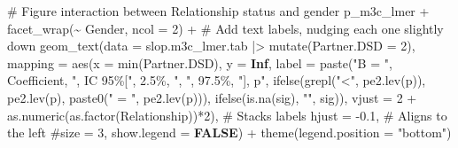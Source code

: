 \documentclass[
  bookmarksnumbered]{article}
\newenvironment{Shaded}{\begin{snugshade}}{\end{snugshade}}
\newcommand{\AttributeTok}[1]{\textcolor[rgb]{0.80,0.80,0.80}{#1}}
\newcommand{\CommentTok}[1]{\textcolor[rgb]{0.50,0.62,0.50}{#1}}
\newcommand{\ConstantTok}[1]{\textcolor[rgb]{0.86,0.64,0.64}{\textbf{#1}}}
\newcommand{\DecValTok}[1]{\textcolor[rgb]{0.86,0.86,0.80}{#1}}
\newcommand{\FloatTok}[1]{\textcolor[rgb]{0.75,0.75,0.82}{#1}}
\newcommand{\FunctionTok}[1]{\textcolor[rgb]{0.94,0.94,0.56}{#1}}
\newcommand{\NormalTok}[1]{\textcolor[rgb]{0.80,0.80,0.80}{#1}}
\newcommand{\SpecialCharTok}[1]{\textcolor[rgb]{0.86,0.64,0.64}{#1}}
\newcommand{\StringTok}[1]{\textcolor[rgb]{0.80,0.58,0.58}{#1}}
\begin{document}
\begin{Shaded}
\begin{Highlighting}[]
\CommentTok{\# Figure interaction between Relationship status and gender}
\NormalTok{p\_m3c\_lmer  }\SpecialCharTok{+}
  \FunctionTok{facet\_wrap}\NormalTok{(}\SpecialCharTok{\textasciitilde{}}\NormalTok{ Gender, }\AttributeTok{ncol =} \DecValTok{2}\NormalTok{) }\SpecialCharTok{+}
  \CommentTok{\# Add text labels, nudging each one slightly down}
  \FunctionTok{geom\_text}\NormalTok{(}\AttributeTok{data =}\NormalTok{ slop.m3c\_lmer.tab }\SpecialCharTok{|\textgreater{}} 
              \FunctionTok{mutate}\NormalTok{(}\AttributeTok{Partner.DSD =} \DecValTok{2}\NormalTok{),}
            \AttributeTok{mapping =} \FunctionTok{aes}\NormalTok{(}\AttributeTok{x =} \FunctionTok{min}\NormalTok{(Partner.DSD), }\AttributeTok{y =} \ConstantTok{Inf}\NormalTok{, }
                          \AttributeTok{label =} \FunctionTok{paste}\NormalTok{(}\StringTok{"B = "}\NormalTok{, Coefficient, }
                                        \StringTok{", IC 95\%["}\NormalTok{, }\StringTok{\textasciigrave{}}\AttributeTok{2.5\%}\StringTok{\textasciigrave{}}\NormalTok{, }\StringTok{", "}\NormalTok{, }\StringTok{\textasciigrave{}}\AttributeTok{97.5\%}\StringTok{\textasciigrave{}}\NormalTok{, }
                                        \StringTok{"], p"}\NormalTok{, }
                                        \FunctionTok{ifelse}\NormalTok{(}\FunctionTok{grepl}\NormalTok{(}\StringTok{"\textless{}"}\NormalTok{, }\FunctionTok{pe2.lev}\NormalTok{(p)), }\FunctionTok{pe2.lev}\NormalTok{(p), }
                                               \FunctionTok{paste0}\NormalTok{(}\StringTok{" = "}\NormalTok{, }\FunctionTok{pe2.lev}\NormalTok{(p))),}
                                        \FunctionTok{ifelse}\NormalTok{(}\FunctionTok{is.na}\NormalTok{(sig), }\StringTok{""}\NormalTok{, sig)),}
                          \AttributeTok{vjust =} \DecValTok{2} \SpecialCharTok{+} \FunctionTok{as.numeric}\NormalTok{(}\FunctionTok{as.factor}\NormalTok{(Relationship))}\SpecialCharTok{*}\DecValTok{2}\NormalTok{),  }\CommentTok{\# Stacks labels}
            \AttributeTok{hjust =} \SpecialCharTok{{-}}\FloatTok{0.1}\NormalTok{,  }\CommentTok{\# Aligns to the left}
            \CommentTok{\#size = 3,}
            \AttributeTok{show.legend =} \ConstantTok{FALSE}\NormalTok{) }\SpecialCharTok{+}
  \FunctionTok{theme}\NormalTok{(}\AttributeTok{legend.position =} \StringTok{"bottom"}\NormalTok{)}
\end{Highlighting}
\end{Shaded}
\end{document}
